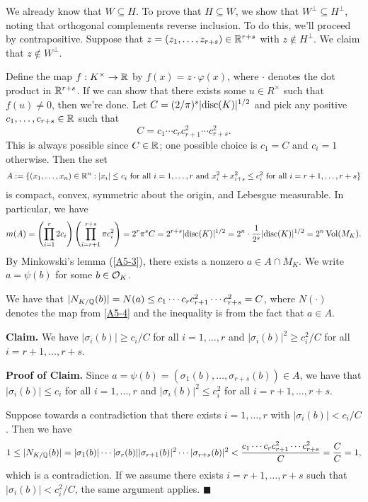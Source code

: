 \begin{pf}
    We already know that $W \subseteq H$. To prove that $H \subseteq W$, we show that 
    $W^\perp \subseteq H^\perp$, noting that orthogonal complements reverse 
    inclusion. To do this, we'll proceed by contrapositive. 
    Suppose that $z = (z_1, \dots, z_{r+s}) \in \mathbb{R}^{r+s}$ 
    with $z \notin H^\perp$. We claim that $z \notin W^\perp$. 

    Define the map $f : K^\times \to \mathbb{R}$ by $f(x) = z \cdot \varphi(x)$, where $\cdot$ 
    denotes the dot product in $\mathbb{R}^{r+s}$. If we can show that 
    there exists some $u \in R^\times$ such that $f(u) \neq 0$, then we're done. 
    Let $C = (2/\pi)^s \lvert\operatorname{disc}(K)\rvert^{1/2}$ 
    and pick any positive $c_1, \dots, c_{r+s} \in \mathbb{R}$ such that 
    \[ C = c_1 \cdots c_r c_{r+1}^2 \cdots c_{r+s}^2. \] 
    This is always possible since $C \in \mathbb{R}$; one possible choice is $c_1 = C$ and 
    $c_i = 1$ otherwise. 
    Then the set 
    \[ A := \{(x_1, \dots, x_n) \in \mathbb{R}^n : |x_i| \leq c_i \text{ for all $i = 1, \dots, r$ 
    and $x_i^2 + x_{i+s}^2 \leq c_i^2$ for all $i = r+1, \dots, r+s$}\} \] 
    is compact, convex, symmetric about the origin, and Lebesgue measurable. In particular, 
    we have
    \[ m(A) = \left( \prod_{i=1}^r 2c_i \right) \left( \prod_{i=r+1}^{r+s} \pi c_i^2 \right) 
    = 2^r \pi^s C = 2^{r+s} \lvert\operatorname{disc}(K)\rvert^{1/2} = 2^n \cdot \frac1{2^s}\lvert\operatorname{disc}(K)\rvert^{1/2}
    = 2^n \operatorname{Vol}(M_K). \] 
    By Minkowski's lemma (\ref{A5-3}), there exists a nonzero $a \in A \cap M_K$. We write 
    $a = \psi(b)$ for some $b \in {\cal O}_K$. 

    We have that $|N_{K/\mathbb{Q}}(b)| = N(a) \leq c_1 \cdots c_r c_{r+1}^2 
    \cdots c_{r+s}^2 = C$, where $N(\cdot)$ denotes the map from \ref{A5-4} and 
    the inequality is from the fact that $a \in A$.

    {\bf Claim.} We have $|\sigma_i(b)| \geq c_i/C$ for all $i = 1, \dots, r$
    and $|\sigma_i(b)|^2 \geq c_i^2/C$ for all $i = r+1, \dots, r+s$.

    {\bf Proof of Claim.} Since $a = \psi(b) = (\sigma_1(b), \dots, \sigma_{r+s}(b)) \in A$, 
    we have that $|\sigma_i(b)| \leq c_i$ for all $i = 1, \dots, r$ and 
    $|\sigma_i(b)|^2 \leq c_i^2$ for all $i = r+1, \dots, r+s$. 

    Suppose towards a contradiction that there exists $i = 1, \dots, r$ with 
    $|\sigma_i(b)| < c_i/C$. Then we have 
    \[ 1 \leq |N_{K/\mathbb{Q}}(b)| = |\sigma_1(b)| \cdots |\sigma_r(b)| |\sigma_{r+1}(b)|^2 
    \cdots |\sigma_{r+s}(b)|^2 < \frac{c_1 \cdots c_r c_{r+1}^2 \cdots c_{r+s}^2}{C} 
    = \frac{C}{C} = 1, \] 
    which is a contradiction. If we assume there exists $i = r+1, \dots, r+s$ 
    such that $|\sigma_i(b)| < c_i^2/C$, the same argument applies. \hfill $\blacksquare$ 


\end{pf}
